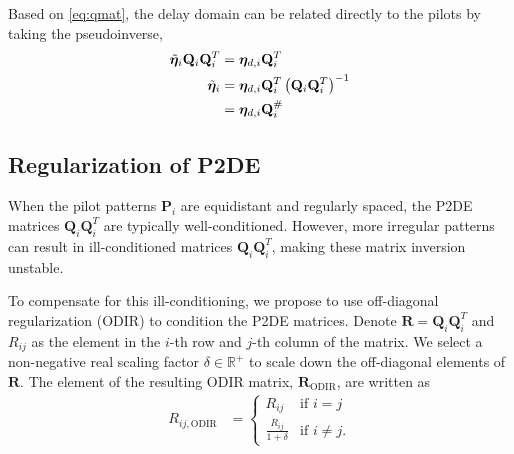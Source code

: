 Based on \ref{eq:qmat}, the delay domain can be related directly to the pilots by taking the pseudoinverse,
\begin{align}
	\tilde{\boldsymbol{\eta}}_{i}\mathbf{Q}_i\mathbf{Q}_i^T &= \boldsymbol{\eta}_{d,i}\mathbf{Q}_i^T \nonumber \\
	\tilde{\boldsymbol{\eta}}_{i} &= \boldsymbol{\eta}_{d,i}\mathbf{Q}_i^T\left(\mathbf{Q}_i\mathbf{Q}_i^T\right)^{-1} \nonumber \\
	&= \boldsymbol{\eta}_{d,i}\mathbf{Q}_i^{\#} \label{eq:p2d}
\end{align}

\subsection{Regularization of P2DE} \label{sect:odir}

When the pilot patterns $\mathbf{P}_i$ are equidistant and regularly spaced, the P2DE matrices $\mathbf{Q}_i\mathbf{Q}_i^T$ are typically well-conditioned. However, more irregular patterns can result in ill-conditioned matrices $\mathbf{Q}_i\mathbf{Q}_i^T$, making these matrix inversion unstable.

To compensate for this ill-conditioning, we propose to use off-diagonal regularization (ODIR) to condition the P2DE matrices. Denote $\mathbf{R} = \mathbf{Q}_i\mathbf{Q}_i^T$ and $R_{ij}$ as the element in the $i$-th row and $j$-th column of the matrix. We select a non-negative real scaling factor $\delta \in \mathbb{R}^{+}$ to scale down the off-diagonal elements of $\mathbf{R}$. The element of the resulting ODIR matrix, $\mathbf{R}_{\text{ODIR}}$, are written as
\begin{align}
    R_{ij, \text{ODIR}} &= 
        \begin{cases}
            R_{ij} & \text{if } i = j\\
            \frac{R_{ij}}{1+\delta} & \text{if } i \neq j.
        \end{cases}
\end{align}

